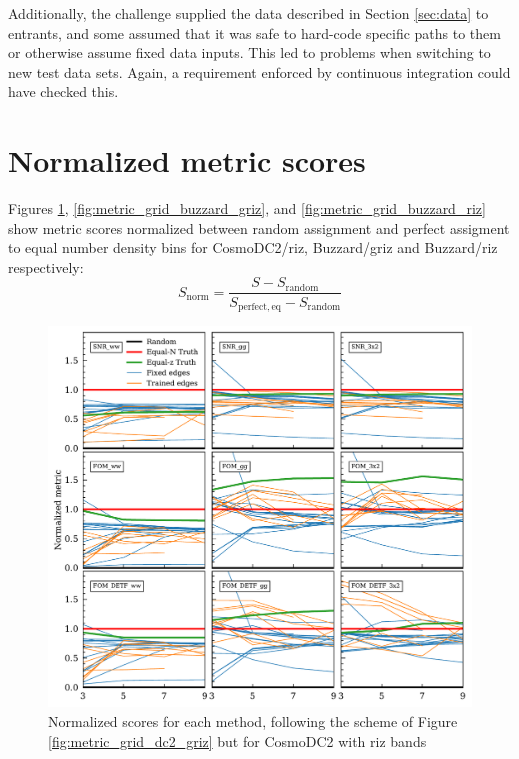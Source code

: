 \documentclass[twocolumn,twocolappendix]{aastex63}
\begin{document}
Additionally, the challenge supplied the data described in Section \ref{sec:data} to entrants,
and some assumed that it was safe to hard-code specific paths to them or
otherwise assume fixed data inputs.  This led to problems when switching to new test data sets. 
Again, a requirement enforced by continuous integration could have checked this.

\section{Normalized metric scores} \label{app:metric_grids}
Figures \ref{fig:metric_grid_dc2_riz}, \ref{fig:metric_grid_buzzard_griz}, and \ref{fig:metric_grid_buzzard_riz} show metric scores normalized between random assignment and perfect assigment to equal number density bins for CosmoDC2/riz, Buzzard/griz and Buzzard/riz respectively:
\begin{equation}
S_\mathrm{norm} = \frac{S - S_\mathrm{random}} {S_\mathrm{perfect,eq} - S_\mathrm{random}}
\end{equation}

\begin{figure}
\includegraphics[width=1\linewidth]{results/metric_grid_dc2_riz.pdf}
\caption{Normalized scores for each method, following the scheme of Figure \ref{fig:metric_grid_dc2_griz}
but for CosmoDC2 with riz bands}
\label{fig:metric_grid_dc2_riz}
\end{figure}
\end{document}
